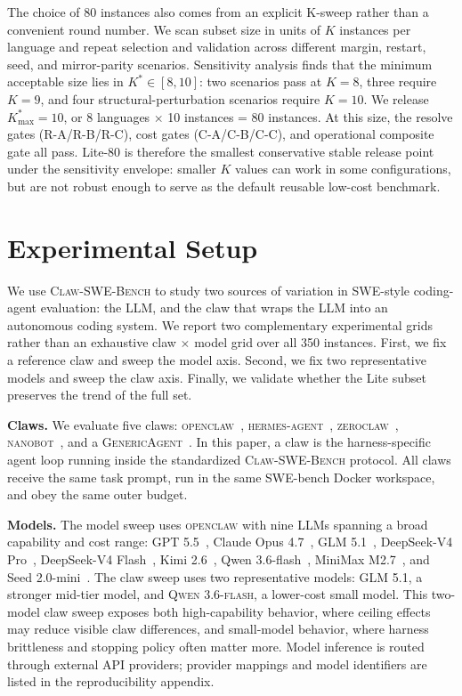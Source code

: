 \documentclass{llmxive}
\begin{document}
The choice of 80 instances also comes from an explicit K-sweep rather than a convenient round number. We scan subset size in units of $K$ instances per language and repeat selection and validation across different margin, restart, seed, and mirror-parity scenarios. Sensitivity analysis finds that the minimum acceptable size lies in $K^*\in[8,10]$: two scenarios pass at $K{=}8$, three require $K{=}9$, and four structural-perturbation scenarios require $K{=}10$. We release $K^*_{\max}=10$, or 8 languages $\times$ 10 instances = 80 instances. At this size, the resolve gates (R-A/R-B/R-C), cost gates (C-A/C-B/C-C), and operational composite gate all pass. Lite-80 is therefore the smallest conservative stable release point under the sensitivity envelope: smaller $K$ values can work in some configurations, but are not robust enough to serve as the default reusable low-cost benchmark.

\section{Experimental Setup}
\label{sec:experiments}

We use \textsc{Claw-SWE-Bench} to study two sources of variation in SWE-style coding-agent evaluation: the LLM, and the claw that wraps the LLM into an autonomous coding system. We report two complementary experimental grids rather than an exhaustive claw $\times$ model grid over all 350 instances. First, we fix a reference claw and sweep the model axis. Second, we fix two representative models and sweep the claw axis. Finally, we validate whether the Lite subset preserves the trend of the full set.

\textbf{Claws.}
We evaluate five claws: \textsc{openclaw}~\cite{steinberger_openclaw}, \textsc{hermes-agent}~\cite{nous_hermes_agent}, \textsc{zeroclaw}~\cite{zeroclaw_labs}, \textsc{nanobot}~\cite{hkuds_nanobot}, and a \textsc{GenericAgent}~\cite{generic_agent_2026}. In this paper, a claw is the harness-specific agent loop running inside the standardized \textsc{Claw-SWE-Bench} protocol. All claws receive the same task prompt, run in the same SWE-bench Docker workspace, and obey the same outer budget.

\textbf{Models.}
The model sweep uses \textsc{openclaw} with nine LLMs spanning a broad capability and cost range: GPT 5.5~\cite{openai_gpt_55}, Claude Opus 4.7~\cite{anthropic_claude_opus_47}, GLM 5.1~\cite{zai_glm_51}, DeepSeek-V4 Pro~\cite{deepseek_v4_pro}, DeepSeek-V4 Flash~\cite{deepseek_v4_flash}, Kimi 2.6~\cite{moonshot_kimi_k26}, Qwen 3.6-flash~\cite{alibaba_qwen36_flash}, MiniMax M2.7~\cite{minimax_m27}, and Seed 2.0-mini~\cite{bytedance_seed_20_mini}. The claw sweep uses two representative models: \textsc{GLM 5.1}, a stronger mid-tier model, and \textsc{Qwen 3.6-flash}, a lower-cost small model. This two-model claw sweep exposes both high-capability behavior, where ceiling effects may reduce visible claw differences, and small-model behavior, where harness brittleness and stopping policy often matter more. Model inference is routed through external API providers; provider mappings and model identifiers are listed in the reproducibility appendix.
\end{document}
